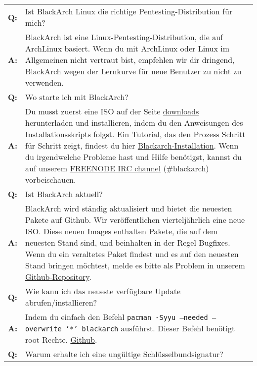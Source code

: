 \begin{tabularx}{\linewidth}{lX}
		\textbf{Q:} & Ist BlackArch Linux die richtige Pentesting-Distribution für mich? \vspace{0.2cm} \\
		\textbf{A:} & BlackArch ist eine Linux-Pentesting-Distribution, die auf ArchLinux basiert. Wenn du mit ArchLinux oder Linux im Allgemeinen nicht vertraut bist, empfehlen wir dir dringend, BlackArch wegen der Lernkurve für neue Benutzer zu nicht zu verwenden. \vspace{0.7cm} \\
		\textbf{Q:} & Wo starte ich mit BlackArch? \vspace{0.2cm} \\
		\textbf{A:} & Du musst zuerst eine ISO auf der Seite \href{https://www.blackarch.org/downloads.html}{downloads} herunterladen und installieren, indem du den Anweisungen des Installationsskripts folgst. Ein Tutorial, das den Prozess Schritt für Schritt zeigt, findest du hier \href{https://www.blackarch.org/blackarch-install.html}{Blackarch-Installation}. Wenn du irgendwelche Probleme hast und Hilfe benötigst, kannst du auf unserem \href{irc://irc.freenode.net/blackarch}{FREENODE IRC channel} (\#blackarch) vorbeischauen.
		\vspace{0.5cm} \\
		\textbf{Q:} & Ist BlackArch aktuell? \vspace{0.2cm} \\
		\textbf{A:} & BlackArch wird ständig aktualisiert und bietet die neuesten Pakete auf Github. Wir veröffentlichen vierteljährlich eine neue ISO. Diese neuen Images enthalten Pakete, die auf dem neuesten Stand sind, und beinhalten in der Regel Bugfixes. Wenn du ein veraltetes Paket findest und es auf den neuesten Stand bringen möchtest, melde es bitte als Problem in unserem \href{https://github.com/BlackArch/blackarch}{Github-Repository}.
		\vspace{0.5cm} \\
		\textbf{Q:} & Wie kann ich das neueste verfügbare Update abrufen/installieren? \vspace{0.2cm} \\
		\textbf{A:} & Indem du einfach den Befehl \texttt{pacman -Syyu --needed --overwrite '*' blackarch} ausführst. Dieser Befehl benötigt root Rechte. \href{https://github.com/BlackArch/blackarch}{Github}. \vspace{0.5cm} \\
		\textbf{Q:} & Warum erhalte ich eine ungültige Schlüsselbundsignatur? \vspace{0.2cm} \\

\end{tabularx}
